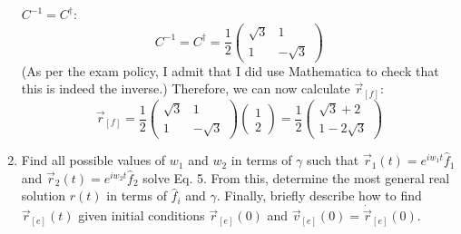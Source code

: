 \documentclass[10pt]{article}
\begin{document}
\begin{enumerate}[label=\alph*)]
\begin{solution}
		$C^{-1} = C^\dagger$:
		\[
			C^{-1} = C^{\dagger} = \frac{1}{2}\begin{pmatrix} \sqrt{3}  & 1 \\ 1 & -\sqrt{3}  \end{pmatrix} 
		\] 
		(As per the exam policy, I admit that I did use Mathematica to check that this is indeed the inverse.) 
		Therefore, we can now calculate $\vec r_{[f]}$:
		\[
			\vec r_{[f]} = \frac{1}{2}\begin{pmatrix} \sqrt{3} & 1 \\ 1 & -\sqrt{3}  \end{pmatrix} \begin{pmatrix} 1\\2 \end{pmatrix} = \frac{1}{2}\begin{pmatrix} \sqrt{3} +2\\ 1 - 2\sqrt{3}  \end{pmatrix} 
		\] 
		\end{solution}
	\item Find all possible values of $w_1$ and $w_2$ in terms of $\gamma$ such that $\vec r_1(t) = 
		e^{i w_1 t} \hat{f}_1$ and $\vec r_2(t) = e^{i w_2 t} \hat{f}_2$ solve Eq. 5. From this, determine
		the most general real solution $r(t)$ in terms of $\hat{f}_i$ and $\gamma$. Finally, briefly describe
		how to find $\vec r_{[e]}(t)$ given initial conditions $\vec r_{[e]}(0)$ and $\vec v_{[e]}(0) = 
		\dot{\vec r}_{[e]}(0)$. 
		

\end{enumerate}
\end{document}
